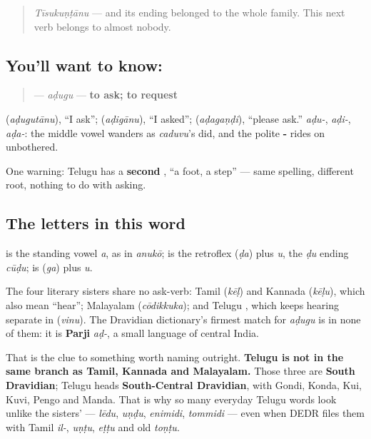 \label{lesson:TE-C34-adugu}



\begin{quote}
\emph{Tīsukuṇṭānu} — and its ending belonged to the whole family. This next verb belongs to almost nobody.
\end{quote}

\subsection*{You'll want to know: }
\begin{quote}
\textbf{} — \emph{aḍugu} — \textbf{to ask; to request}
\end{quote}

\textbf{} (\emph{aḍugutānu}), \textquotedblleft{}I ask\textquotedblright{}; \textbf{} (\emph{aḍigānu}), \textquotedblleft{}I asked\textquotedblright{}; \textbf{} (\emph{aḍagaṇḍi}), \textquotedblleft{}please ask.\textquotedblright{} \emph{aḍu-}, \emph{aḍi-}, \emph{aḍa-}: the middle vowel wanders as \emph{caduvu}'s did, and the polite \textbf{-} rides on unbothered.

One warning: Telugu has a \textbf{second} , \textquotedblleft{}a foot, a step\textquotedblright{} — same spelling, different root, nothing to do with asking.

\subsection*{The letters in this word}
\textbf{} is the standing vowel \emph{a}, as in \emph{anukō}; \textbf{} is the retroflex \textbf{} (\emph{ḍa}) plus \emph{u}, the \emph{ḍu} ending \emph{cūḍu}; \textbf{} is \textbf{} (\emph{ga}) plus \emph{u}.

\begin{cousinweb}
The four literary sisters share no ask-verb: Tamil \textbf{} (\emph{kēḷ}) and Kannada \textbf{} (\emph{kēḷu}), which also mean \textquotedblleft{}hear\textquotedblright{}; Malayalam \textbf{} (\emph{cōdikkuka}); and Telugu \textbf{}, which keeps hearing separate in \textbf{} (\emph{vinu}). The Dravidian dictionary's firmest match for \emph{aḍugu} is in none of them: it is \textbf{Parji} \emph{aḍ-}, a small language of central India.

That is the clue to something worth naming outright. \textbf{Telugu is not in the same branch as Tamil, Kannada and Malayalam.} Those three are \textbf{South Dravidian}; Telugu heads \textbf{South-Central Dravidian}, with Gondi, Konda, Kui, Kuvi, Pengo and Manda. That is why so many everyday Telugu words look unlike the sisters' — \emph{lēdu}, \emph{uṇḍu}, \emph{enimidi}, \emph{tommidi} — even when DEDR files them with Tamil \emph{il-}, \emph{uṇṭu}, \emph{eṭṭu} and old \emph{toṇṭu}.
\end{cousinweb}

